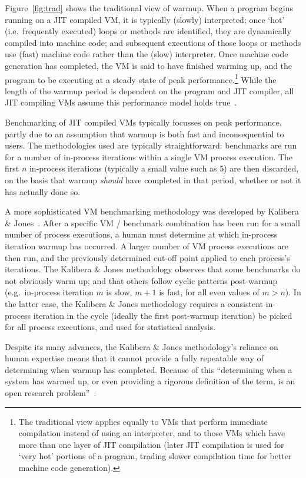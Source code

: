 \documentclass[preprint,numbers,10pt]{sigplanconf}
\newcommand{\kalibera}{Kalibera \& Jones\xspace}
\begin{document}
Figure~\ref{fig:trad} shows the traditional view of warmup.
When a program begins running on a JIT compiled VM, it is typically (slowly)
interpreted; once `hot' (i.e.~frequently executed) loops or methods are
identified, they are dynamically compiled into machine code; and subsequent
executions of those loops or methods use (fast) machine code rather than the
(slow) interpreter. Once machine code generation has completed, the VM is
said to have finished warming up, and the program to be executing
at a steady state of peak performance.\footnote{The traditional view applies equally to VMs
that perform immediate compilation instead of using an interpreter, and to
those VMs which have more than one layer of JIT compilation (later JIT
compilation is used for `very hot' portions of a program, trading slower
compilation time for better machine code generation).}
While the length of the warmup period
is dependent on the program and JIT compiler, all JIT compiling
VMs assume this performance model holds true~\cite{kalibera13rigorous}.

Benchmarking of JIT compiled VMs typically focusses on peak
performance, partly due to an assumption that
warmup is both fast and inconsequential to users.
The methodologies used are typically straightforward: benchmarks are run for a number
of in-process iterations within a single VM process execution.
The first $n$ in-process iterations (typically a small value such as 5)
are then discarded, on the basis that warmup \emph{should} have completed in
that period, whether or not it has actually done so.

A more sophisticated VM benchmarking methodology
was developed by \kalibera~\cite{kalibera12quantifying,kalibera13rigorous}. After
a specific VM / benchmark combination has been run for a small number of
process executions, a human must determine at which in-process iteration warmup
has occurred. A larger number of VM process executions are then
run, and the previously determined cut-off point applied to each process's
iterations. The \kalibera methodology observes that some benchmarks do not
obviously warm up; and that others follow cyclic patterns post-warmup
(e.g.~in-process iteration $m$ is slow, $m+1$ is fast, for all even values of $m > n$). In
the latter case, the \kalibera methodology requires a consistent in-process iteration in
the cycle (ideally the first post-warmup iteration) be picked for all process
executions, and used for statistical analysis.

Despite its many advances, the \kalibera methodology's reliance on human
expertise means that it cannot provide a fully repeatable way of determining
when warmup has completed. Because of this
``determining when a system has warmed up, or even providing a
rigorous definition of the term, is an open research problem''~\cite{seaton15phd}.
\end{document}
